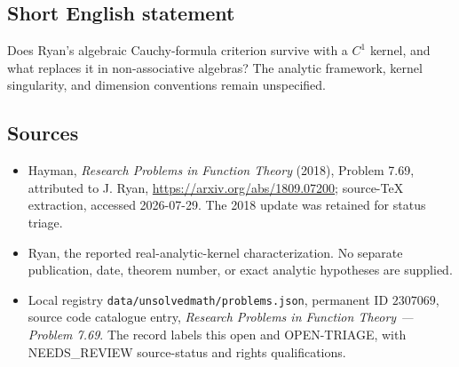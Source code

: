 \documentclass[11pt]{article}
\begin{document}
\subsection{Short English statement}
Does Ryan's algebraic Cauchy-formula criterion survive with a $C^1$ kernel, and what replaces it in non-associative algebras? The analytic framework, kernel singularity, and dimension conventions remain unspecified.
\subsection{Sources}
\begin{itemize}
\item Hayman, \emph{Research Problems in Function Theory} (2018), Problem 7.69, attributed to J. Ryan, \url{https://arxiv.org/abs/1809.07200}; source-TeX extraction, accessed 2026-07-29. The 2018 update was retained for status triage.
\item Ryan, the reported real-analytic-kernel characterization. No separate publication, date, theorem number, or exact analytic hypotheses are supplied.
\item Local registry \texttt{data/unsolvedmath/problems.json}, permanent ID $2307069$, source code catalogue entry, \emph{Research Problems in Function Theory --- Problem 7.69}. The record labels this open and OPEN-TRIAGE, with NEEDS\_REVIEW source-status and rights qualifications.
\end{itemize}
\end{document}
